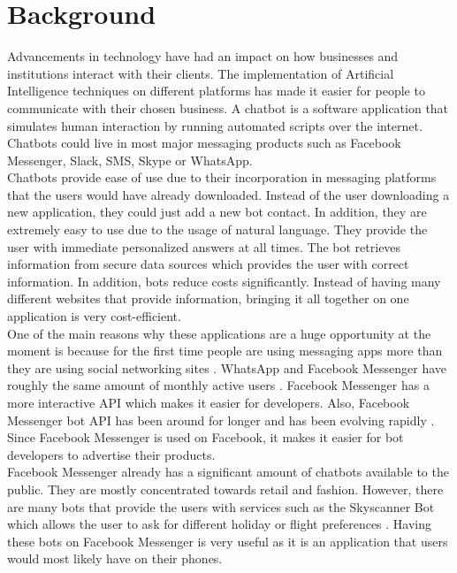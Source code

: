 \documentclass[journal, a4paper]{IEEEtran}
\begin{document}
\section{Background}

Advancements in technology have had an impact on how businesses and institutions interact with their clients. The implementation of Artificial Intelligence techniques on different platforms has made it easier for people to communicate with their chosen business. A chatbot is a software application that simulates human interaction by running automated scripts over the internet. Chatbots could live in most major messaging products such as Facebook Messenger, Slack, SMS, Skype or  WhatsApp.\\ 

Chatbots provide ease of use due to their incorporation in messaging platforms that the users would have already downloaded. Instead of the user downloading a new application, they could just add a new bot contact. In addition, they are extremely easy to use due to the usage of natural language. They provide the user with immediate personalized answers at all times. The bot retrieves information from secure data sources which provides the user with correct information. In addition, bots reduce costs significantly. Instead of having many different websites that provide information, bringing it all together on one application is very cost-efficient.\\ 

One of the main reasons why these applications are a huge opportunity at the moment is because for the first time people are using messaging apps more than they are using social networking sites \cite{msgAppsData}. WhatsApp and Facebook Messenger have roughly the same amount of monthly active users \cite{statsPortal}. Facebook Messenger has a more interactive API which makes it easier for developers. Also, Facebook Messenger bot API has been around for longer and has been evolving rapidly \cite{botware}. Since Facebook Messenger is used on Facebook, it makes it easier for bot developers to advertise their products.\\ 

Facebook Messenger already has a significant amount of chatbots available to the public. They are mostly concentrated towards retail and fashion. However, there are many bots that provide the users with services such as the Skyscanner Bot which allows the user to ask for different holiday or flight preferences \cite{skyscanner}. Having these bots on Facebook Messenger is very useful as it is an application that users would most likely have on their phones. 
\end{document}
